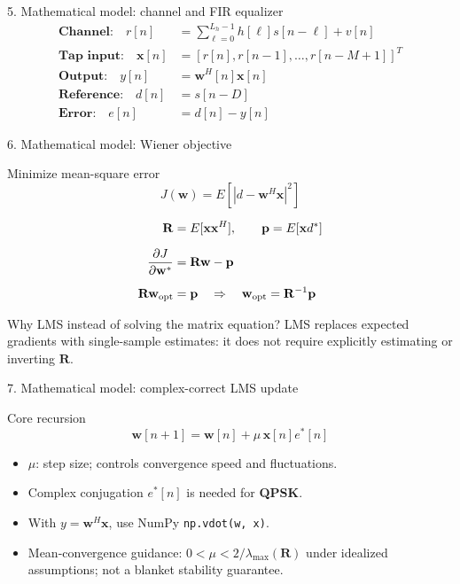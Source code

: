 \documentclass[aspectratio=169,11pt]{beamer}
\begin{document}
\begin{frame}{5. Mathematical model: channel and FIR equalizer}
\begin{align*}
 \textbf{Channel:}\quad r[n] &= \sum_{\ell=0}^{L_h-1} h[\ell]s[n-\ell] + v[n]\\[8pt]
 \textbf{Tap input:}\quad \mathbf{x}[n] &= [r[n],r[n-1],\ldots,r[n-M+1]]^T\\[8pt]
 \textbf{Output:}\quad y[n] &= \mathbf{w}^H[n]\mathbf{x}[n]\\[8pt]
 \textbf{Reference:}\quad d[n] &= s[n-D]\\[8pt]
 \textbf{Error:}\quad e[n] &= d[n]-y[n]
\end{align*}
\vspace{0.2cm}
\end{frame}

\begin{frame}{6. Mathematical model: Wiener objective}
\begin{block}{Minimize mean-square error}
\[J(\mathbf w)=E[|d-\mathbf w^H\mathbf x|^2]\]
\end{block}
\begin{align*}
 \mathbf R &= E[\mathbf x\mathbf x^H],\qquad \mathbf p=E[\mathbf x d^*]\\[6pt]
 \frac{\partial J}{\partial \mathbf w^*} &= \mathbf R\mathbf w-\mathbf p\\[6pt]
 \mathbf R\mathbf w_{\rm opt} &= \mathbf p \quad\Rightarrow\quad
 \mathbf w_{\rm opt}=\mathbf R^{-1}\mathbf p
\end{align*}
\vspace{-0.14cm}
\begin{alertblock}{Why LMS instead of solving the matrix equation?}
LMS replaces expected gradients with single-sample estimates: it does not require explicitly estimating or inverting $\mathbf R$.
\end{alertblock}
\end{frame}

\begin{frame}{7. Mathematical model: complex-correct LMS update}
\begin{block}{Core recursion}
\[\boxed{\mathbf w[n+1]=\mathbf w[n]+\mu\,\mathbf x[n]e^*[n]}\]
\end{block}
\vspace{0.1cm}
\begin{itemize}\setlength{\itemsep}{7pt}
\item $\mu$: step size; controls convergence speed and fluctuations.
\item Complex conjugation $e^*[n]$ is needed for \textbf{QPSK}.
\item With $y=\mathbf w^H\mathbf x$, use NumPy \texttt{np.vdot(w, x)}.
\item Mean-convergence guidance: $0<\mu<2/\lambda_{\max}(\mathbf R)$ under idealized assumptions; not a blanket stability guarantee.
\end{itemize}
\vspace{0.2cm}
\end{frame}
\end{document}
